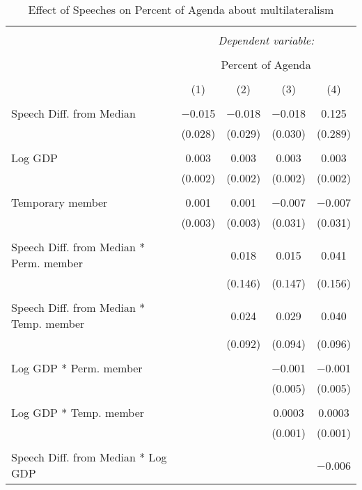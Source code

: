 
\begin{table}[!htbp] \centering 
  \caption{Effect of Speeches on Percent of Agenda about multilateralism} 
  \label{} 
\begin{tabular}{@{\extracolsep{5pt}}lcccc} 
\\[-1.8ex]\hline 
\hline \\[-1.8ex] 
 & \multicolumn{4}{c}{\textit{Dependent variable:}} \\ 
\cline{2-5} 
\\[-1.8ex] & \multicolumn{4}{c}{Percent of Agenda} \\ 
\\[-1.8ex] & (1) & (2) & (3) & (4)\\ 
\hline \\[-1.8ex] 
 Speech Diff. from Median & $-$0.015 & $-$0.018 & $-$0.018 & 0.125 \\ 
  & (0.028) & (0.029) & (0.030) & (0.289) \\ 
  & & & & \\ 
 Log GDP & 0.003 & 0.003 & 0.003 & 0.003 \\ 
  & (0.002) & (0.002) & (0.002) & (0.002) \\ 
  & & & & \\ 
 Temporary member & 0.001 & 0.001 & $-$0.007 & $-$0.007 \\ 
  & (0.003) & (0.003) & (0.031) & (0.031) \\ 
  & & & & \\ 
 Speech Diff. from Median * Perm. member &  & 0.018 & 0.015 & 0.041 \\ 
  &  & (0.146) & (0.147) & (0.156) \\ 
  & & & & \\ 
 Speech Diff. from Median * Temp. member &  & 0.024 & 0.029 & 0.040 \\ 
  &  & (0.092) & (0.094) & (0.096) \\ 
  & & & & \\ 
 Log GDP * Perm. member &  &  & $-$0.001 & $-$0.001 \\ 
  &  &  & (0.005) & (0.005) \\ 
  & & & & \\ 
 Log GDP * Temp. member &  &  & 0.0003 & 0.0003 \\ 
  &  &  & (0.001) & (0.001) \\ 
  & & & & \\ 
 Speech Diff. from Median * Log GDP &  &  &  & $-$0.006 \\ 

\end{tabular}
\end{table}
